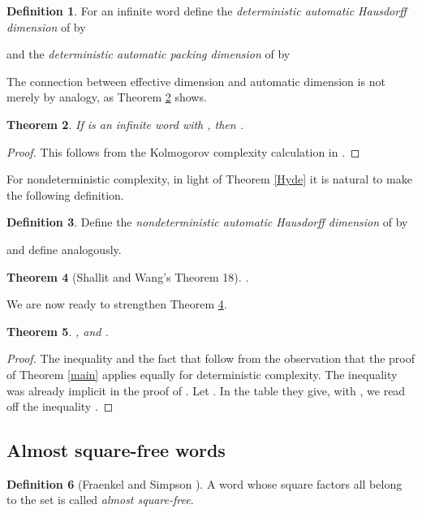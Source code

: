 \documentclass[12pt]{article}
\newcommand{\squarefree}{square-free}
\theoremstyle{plain}
\newtheorem{thm}{Theorem}
\theoremstyle{definition}
\newtheorem{df}[thm]{Definition}
\theoremstyle{remark}
\begin{document}
			\begin{df}\label{daHd}
				For an infinite word  define the \emph{deterministic automatic Hausdorff dimension} of  by
				
				and the \emph{deterministic automatic packing dimension} of  by
				
			\end{df}
			The connection between effective dimension and automatic dimension is not merely by analogy, as Theorem \ref{christmas2014} shows.
			\begin{thm}\label{christmas2014}
				If  is an infinite word with , then .
			\end{thm}
			\begin{proof}
				This follows from the Kolmogorov complexity calculation in \cite[Theorem 9]{MR1897300}.
			\end{proof}
			For nondeterministic complexity, in light of Theorem \ref{Hyde} it is natural to make the following definition.
			\begin{df}\label{naHd}
				Define the \emph{nondeterministic automatic Hausdorff dimension} of  by
				
				and define  analogously.
			\end{df}
			\begin{thm}[Shallit and Wang's Theorem 18]\label{toStrengthen}
				.
			\end{thm}
			We are now ready to strengthen Theorem \ref{toStrengthen}.
			\begin{thm}
				, and .
			\end{thm}
			\begin{proof}
				The inequality  and the fact that  follow from the observation that
				the proof of Theorem \ref{main} applies equally for deterministic complexity.
				The inequality  was already implicit in the proof of \cite[Theorem 18]{MR1897300}.
				Let .
				In the table they give, with , we read off the inequality .
			\end{proof}
		\subsection{Almost {\squarefree} words}
			\begin{df}[Fraenkel and Simpson \cite{MR1309124}]
				A word whose square factors all belong to the set  is called \emph{almost {\squarefree}}.
			\end{df}
\end{document}
